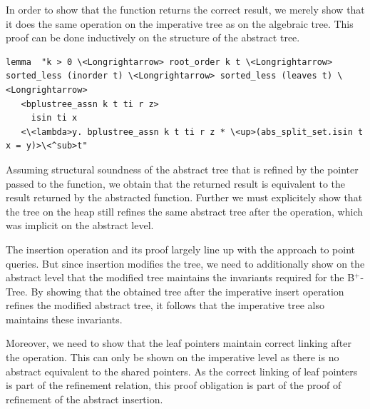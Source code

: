 \documentclass[a4paper,UKenglish,cleveref, autoref, thm-restate]{lipics-v2021}
\newcommand{\btree}{B$^+$-Tree}
\begin{document}
In order to show that the function returns the correct result,
we merely show that it does the same operation on the imperative tree
as on the algebraic tree.
This proof can be done inductively on the structure of the abstract tree.

\begin{lstlisting}[mathescape=true, language=Isabelle,label=lst:isin-refines]
lemma  "k > 0 \<Longrightarrow> root_order k t \<Longrightarrow> sorted_less (inorder t) \<Longrightarrow> sorted_less (leaves t) \<Longrightarrow>
   <bplustree_assn k t ti r z>
     isin ti x
   <\<lambda>y. bplustree_assn k t ti r z * \<up>(abs_split_set.isin t x = y)>\<^sub>t"
\end{lstlisting}

Assuming structural soundness of the abstract tree that is refined by the pointer passed to the function,
we obtain that the returned result is equivalent to the result returned by the abstracted function.
Further we must explicitely show that the tree on the heap
still refines the same abstract tree after the operation,
which was implicit on the abstract level.

The insertion operation and its proof largely line up with the approach to point queries.
But since insertion modifies the tree,
we need to additionally show on the abstract level that the modified tree
maintains the invariants required for the \btree.
By showing that the obtained tree after the imperative insert operation
refines the modified abstract tree, it follows that the imperative tree
also maintains these invariants.

Moreover, we need to show that the leaf pointers
maintain correct linking after the operation.
This can only be shown on the imperative level as there is no abstract equivalent
to the shared pointers.
As the correct linking of leaf pointers is part of the refinement relation,
this proof obligation is part of the proof of refinement of the abstract insertion.



%
%
%
\end{document}
